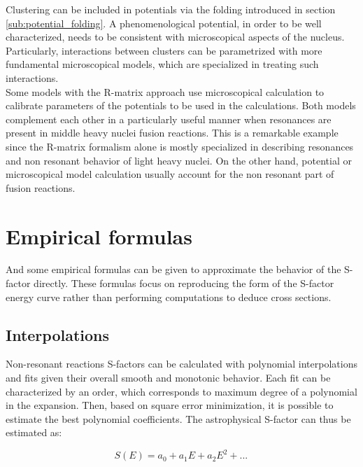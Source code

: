 \documentclass[openany]{book}
\begin{document}
Clustering can be included in potentials via the folding introduced in section \ref{sub:potential_folding}. A phenomenological potential, in order to be well characterized, needs to be consistent with microscopical aspects of the nucleus.  Particularly, interactions between clusters can be parametrized with more fundamental microscopical models, which are specialized in treating such interactions. \\

Some models with the R-matrix approach use microscopical calculation to calibrate parameters of the potentials to be used in the calculations. Both models complement each other in a particularly useful manner when resonances are present in middle heavy nuclei fusion reactions. This is a remarkable example since the R-matrix formalism alone is mostly specialized in describing resonances and non resonant behavior of light heavy nuclei. On the other hand, potential or microscopical model calculation usually account for the non resonant part of fusion reactions. \\

\section{Empirical formulas} \label{sec:empiricalFormulas}

And some empirical formulas can be given to approximate the behavior of the S-factor directly. These formulas focus on reproducing the form of the S-factor energy curve rather than performing computations to deduce cross sections.

\subsection{Interpolations} \label{sub:empirical_interpolation}

Non-resonant reactions S-factors can be calculated with polynomial interpolations and fits given their overall smooth and monotonic behavior. Each fit can be characterized by an order, which corresponds to maximum degree of a polynomial in the expansion. Then, based on square error minimization, it is possible to estimate the best polynomial coefficients. The astrophysical S-factor can thus be estimated as:

\begin{equation}  \label{eq:empirical_polynomial}
	S(E) = a_0 + a_1E + a_2 E^2 + ... \, 
\end{equation}
\end{document}
